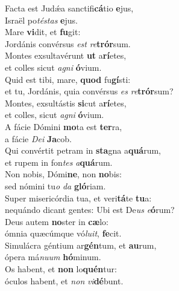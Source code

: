 \evenverse Facta est Judǽa sanctifi\textbf{cá}tio \textbf{e}jus,~\*\\
\evenverse Israël po\textit{té}\textit{stas} \textbf{e}jus.\\
\oddverse Mare \textbf{vi}dit, et \textbf{fu}git:~\*\\
\oddverse Jordánis convérsus \textit{est} \textit{re}\textbf{trór}sum.\\
\evenverse Montes exsultavérunt \textbf{ut} a\textbf{rí}etes,~\*\\
\evenverse et colles sicut \textit{a}\textit{gni} \textbf{ó}vium.\\
\oddverse Quid est tibi, mare, \textbf{quod} fu\textbf{gí}sti:~\*\\
\oddverse et tu, Jordánis, quia convérsus \textit{es} \textit{re}\textbf{trór}sum?\\
\evenverse Montes, exsultástis \textbf{si}cut a\textbf{rí}etes,~\*\\
\evenverse et colles, sicut \textit{a}\textit{gni} \textbf{ó}vium.\\
\oddverse A fácie Dómini \textbf{mo}ta est \textbf{ter}ra,~\*\\
\oddverse a fácie \textit{De}\textit{i} \textbf{Ja}cob.\\
\evenverse Qui convértit petram in \textbf{sta}gna a\textbf{quá}rum,~\*\\
\evenverse et rupem in fon\textit{tes} \textit{a}\textbf{quá}rum.\\
\oddverse Non nobis, Dómi\textbf{ne}, non \textbf{no}bis:~\*\\
\oddverse sed nómini tu\textit{o} \textit{da} \textbf{gló}riam.\\
\evenverse Super misericórdia tua, et veri\textbf{tá}te \textbf{tu}a:~\*\\
\evenverse nequándo dicant gentes: Ubi est De\textit{us} \textit{e}\textbf{ó}rum?\\
\oddverse Deus autem \textbf{no}ster in \textbf{cæ}lo:~\*\\
\oddverse ómnia quæcúmque vó\textit{lu}\textit{it}, \textbf{fe}cit.\\
\evenverse Simulácra géntium ar\textbf{gén}tum, et \textbf{au}rum,~\*\\
\evenverse ópera má\textit{nu}\textit{um} \textbf{hó}minum.\\
\oddverse Os habent, et \textbf{non} lo\textbf{quén}tur:~\*\\
\oddverse óculos habent, et \textit{non} \textit{vi}\textbf{dé}bunt.\\
